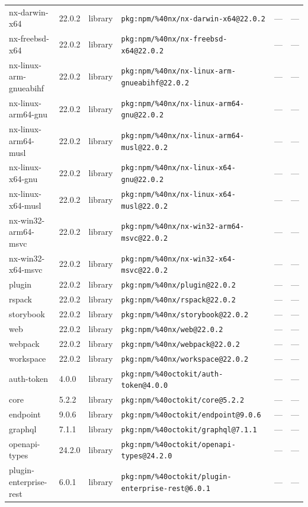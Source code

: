 \documentclass[11pt]{article}
\begin{document}
\begin{longtable}{|l|l|l|p{2.2cm}|l|p{4cm}|}
nx-darwin-x64 & 22.0.2 & library & \texttt{pkg:npm/\%40nx/nx-darwin-x64@22.0.2} & — & — \\
nx-freebsd-x64 & 22.0.2 & library & \texttt{pkg:npm/\%40nx/nx-freebsd-x64@22.0.2} & — & — \\
nx-linux-arm-gnueabihf & 22.0.2 & library & \texttt{pkg:npm/\%40nx/nx-linux-arm-gnueabihf@22.0.2} & — & — \\
nx-linux-arm64-gnu & 22.0.2 & library & \texttt{pkg:npm/\%40nx/nx-linux-arm64-gnu@22.0.2} & — & — \\
nx-linux-arm64-musl & 22.0.2 & library & \texttt{pkg:npm/\%40nx/nx-linux-arm64-musl@22.0.2} & — & — \\
nx-linux-x64-gnu & 22.0.2 & library & \texttt{pkg:npm/\%40nx/nx-linux-x64-gnu@22.0.2} & — & — \\
nx-linux-x64-musl & 22.0.2 & library & \texttt{pkg:npm/\%40nx/nx-linux-x64-musl@22.0.2} & — & — \\
nx-win32-arm64-msvc & 22.0.2 & library & \texttt{pkg:npm/\%40nx/nx-win32-arm64-msvc@22.0.2} & — & — \\
nx-win32-x64-msvc & 22.0.2 & library & \texttt{pkg:npm/\%40nx/nx-win32-x64-msvc@22.0.2} & — & — \\
plugin & 22.0.2 & library & \texttt{pkg:npm/\%40nx/plugin@22.0.2} & — & — \\
rspack & 22.0.2 & library & \texttt{pkg:npm/\%40nx/rspack@22.0.2} & — & — \\
storybook & 22.0.2 & library & \texttt{pkg:npm/\%40nx/storybook@22.0.2} & — & — \\
web & 22.0.2 & library & \texttt{pkg:npm/\%40nx/web@22.0.2} & — & — \\
webpack & 22.0.2 & library & \texttt{pkg:npm/\%40nx/webpack@22.0.2} & — & — \\
workspace & 22.0.2 & library & \texttt{pkg:npm/\%40nx/workspace@22.0.2} & — & — \\
auth-token & 4.0.0 & library & \texttt{pkg:npm/\%40octokit/auth-token@4.0.0} & — & — \\
core & 5.2.2 & library & \texttt{pkg:npm/\%40octokit/core@5.2.2} & — & — \\
endpoint & 9.0.6 & library & \texttt{pkg:npm/\%40octokit/endpoint@9.0.6} & — & — \\
graphql & 7.1.1 & library & \texttt{pkg:npm/\%40octokit/graphql@7.1.1} & — & — \\
openapi-types & 24.2.0 & library & \texttt{pkg:npm/\%40octokit/openapi-types@24.2.0} & — & — \\
plugin-enterprise-rest & 6.0.1 & library & \texttt{pkg:npm/\%40octokit/plugin-enterprise-rest@6.0.1} & — & — \\

\end{longtable}
\end{document}
